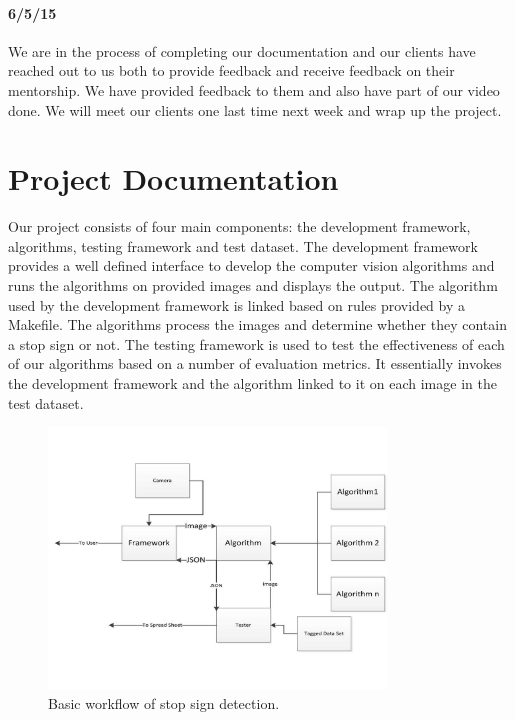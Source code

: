 \documentclass[letterpaper,10pt,titlepage]{article}
\begin{document}
    \paragraph*{6/5/15}
    We are in the process of completing our documentation and our clients have
    reached out to us both to provide feedback and receive feedback on their
    mentorship. We have provided feedback to them and also have part of our 
    video done. We will meet our clients one last time next week and wrap up
    the project.

\section*{Project Documentation}
Our project consists of four main components: the development framework, 
algorithms, testing framework and test dataset. The development framework
provides a well defined interface to develop the computer vision algorithms and
runs the algorithms on provided images and displays the output. The algorithm 
used by the development framework is linked based on rules provided by a 
Makefile. The algorithms process the images and determine whether they contain
a stop sign or not. The testing framework is used to test the effectiveness of
each of our algorithms based on a number of evaluation metrics. It essentially
invokes the development framework and the algorithm linked to it on each image
in the test dataset.

\begin{figure}[H]
    \centering
    \includegraphics[width=0.8\textwidth]{dataflow.pdf}
    \caption{Basic workflow of stop sign detection.}
\end{figure}
\end{document}
